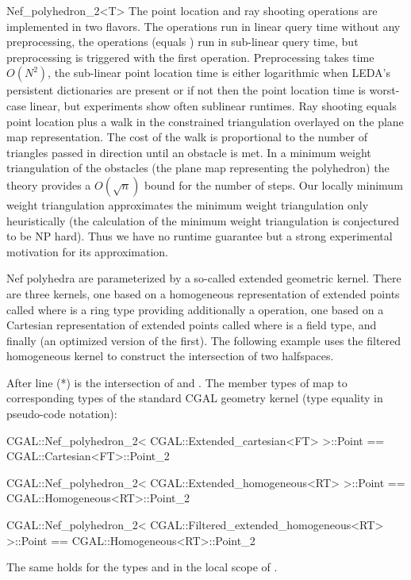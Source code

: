 \begin{ccRefClass}{Nef_polyhedron_2<T>}
The point location and ray shooting operations are implemented in two
flavors. The  operations run in linear query time without
any preprocessing, the  operations (equals )
run in sub-linear query time, but preprocessing is triggered with the
first operation. Preprocessing takes time $O(N^2)$, the sub-linear
point location time is either logarithmic when LEDA's persistent
dictionaries are present or if not then the point location time is
worst-case linear, but experiments show often sublinear runtimes.  Ray
shooting equals point location plus a walk in the constrained
triangulation overlayed on the plane map representation. The cost of
the walk is proportional to the number of triangles passed in
direction  until an obstacle is met. In a minimum weight
triangulation of the obstacles (the plane map representing the
polyhedron) the theory provides a $O(\sqrt{n})$ bound for the number
of steps. Our locally minimum weight triangulation approximates the
minimum weight triangulation only heuristically (the calculation of
the minimum weight triangulation is conjectured to be NP hard). Thus
we have no runtime guarantee but a strong experimental motivation for
its approximation.

\ccExample

Nef polyhedra are parameterized by a so-called extended geometric
kernel. There are three kernels, one based on a homogeneous
representation of extended points called
 where  is a ring type providing
additionally a  operation, one based on a Cartesian
representation of extended points called 
where  is a field type, and finally
 (an optimized version of the
first). The following example uses the filtered homogeneous kernel to
construct the intersection of two halfspaces.


After line (*)  is the intersection of  and . 
The member types of 
map to corresponding types of the standard CGAL geometry kernel
(type equality in pseudo-code notation):
\begin{ccExampleCode}
CGAL::Nef_polyhedron_2< CGAL::Extended_cartesian<FT> >::Point
  == CGAL::Cartesian<FT>::Point_2

CGAL::Nef_polyhedron_2< CGAL::Extended_homogeneous<RT> >::Point
   == CGAL::Homogeneous<RT>::Point_2

CGAL::Nef_polyhedron_2< CGAL::Filtered_extended_homogeneous<RT> >::Point
   == CGAL::Homogeneous<RT>::Point_2
\end{ccExampleCode}
The same holds for the types  and  in the
local scope of .

\end{ccRefClass}


